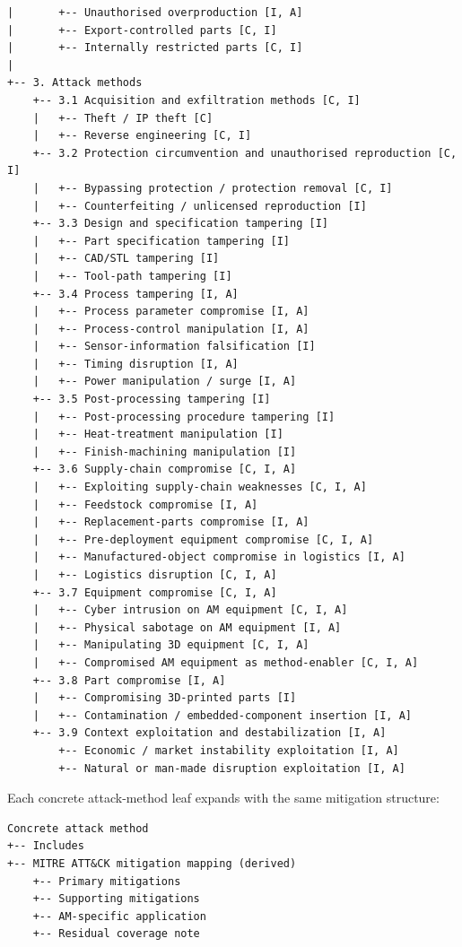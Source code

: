 \documentclass[10pt,a4paper,oneside]{report}
\begin{document}
\begin{Verbatim}[fontsize=\small,breaklines=true,breakanywhere=true]
|       +-- Unauthorised overproduction [I, A]
|       +-- Export-controlled parts [C, I]
|       +-- Internally restricted parts [C, I]
|
+-- 3. Attack methods
    +-- 3.1 Acquisition and exfiltration methods [C, I]
    |   +-- Theft / IP theft [C]
    |   +-- Reverse engineering [C, I]
    +-- 3.2 Protection circumvention and unauthorised reproduction [C, I]
    |   +-- Bypassing protection / protection removal [C, I]
    |   +-- Counterfeiting / unlicensed reproduction [I]
    +-- 3.3 Design and specification tampering [I]
    |   +-- Part specification tampering [I]
    |   +-- CAD/STL tampering [I]
    |   +-- Tool-path tampering [I]
    +-- 3.4 Process tampering [I, A]
    |   +-- Process parameter compromise [I, A]
    |   +-- Process-control manipulation [I, A]
    |   +-- Sensor-information falsification [I]
    |   +-- Timing disruption [I, A]
    |   +-- Power manipulation / surge [I, A]
    +-- 3.5 Post-processing tampering [I]
    |   +-- Post-processing procedure tampering [I]
    |   +-- Heat-treatment manipulation [I]
    |   +-- Finish-machining manipulation [I]
    +-- 3.6 Supply-chain compromise [C, I, A]
    |   +-- Exploiting supply-chain weaknesses [C, I, A]
    |   +-- Feedstock compromise [I, A]
    |   +-- Replacement-parts compromise [I, A]
    |   +-- Pre-deployment equipment compromise [C, I, A]
    |   +-- Manufactured-object compromise in logistics [I, A]
    |   +-- Logistics disruption [C, I, A]
    +-- 3.7 Equipment compromise [C, I, A]
    |   +-- Cyber intrusion on AM equipment [C, I, A]
    |   +-- Physical sabotage on AM equipment [I, A]
    |   +-- Manipulating 3D equipment [C, I, A]
    |   +-- Compromised AM equipment as method-enabler [C, I, A]
    +-- 3.8 Part compromise [I, A]
    |   +-- Compromising 3D-printed parts [I]
    |   +-- Contamination / embedded-component insertion [I, A]
    +-- 3.9 Context exploitation and destabilization [I, A]
        +-- Economic / market instability exploitation [I, A]
        +-- Natural or man-made disruption exploitation [I, A]
\end{Verbatim}

Each concrete attack-method leaf expands with the same mitigation structure:

\begin{Verbatim}[fontsize=\small,breaklines=true,breakanywhere=true]
Concrete attack method
+-- Includes
+-- MITRE ATT&CK mitigation mapping (derived)
    +-- Primary mitigations
    +-- Supporting mitigations
    +-- AM-specific application
    +-- Residual coverage note
\end{Verbatim}
\end{document}
